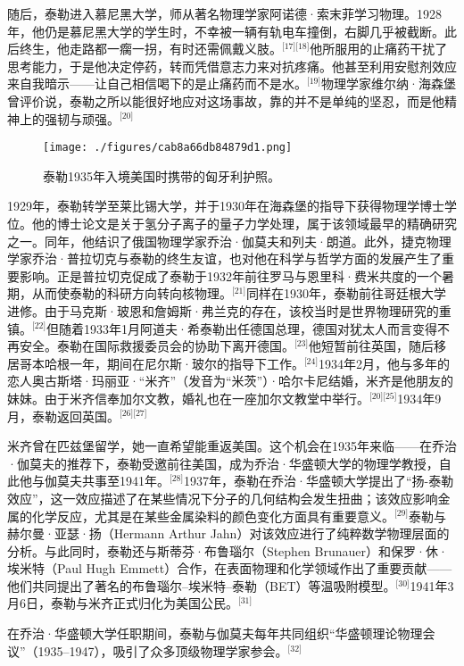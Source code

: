 随后，泰勒进入慕尼黑大学，师从著名物理学家阿诺德·索末菲学习物理。1928年，他仍是慕尼黑大学的学生时，不幸被一辆有轨电车撞倒，右脚几乎被截断。此后终生，他走路都一瘸一拐，有时还需佩戴义肢。\(^\text{[17][18]}\)他所服用的止痛药干扰了思考能力，于是他决定停药，转而凭借意志力来对抗疼痛。他甚至利用安慰剂效应来自我暗示——让自己相信喝下的是止痛药而不是水。\(^\text{[19]}\)物理学家维尔纳·海森堡曾评价说，泰勒之所以能很好地应对这场事故，靠的并不是单纯的坚忍，而是他精神上的强韧与顽强。\(^\text{[20]}\)
\begin{figure}[ht]
\centering
\texttt{[image: ./figures/cab8a66db84879d1.png]}
\caption{泰勒1935年入境美国时携带的匈牙利护照。} \label{fig_ADHTL_3}
\end{figure}
1929年，泰勒转学至莱比锡大学，并于1930年在海森堡的指导下获得物理学博士学位。他的博士论文是关于氢分子离子的量子力学处理，属于该领域最早的精确研究之一。同年，他结识了俄国物理学家乔治·伽莫夫和列夫·朗道。此外，捷克物理学家乔治·普拉切克与泰勒的终生友谊，也对他在科学与哲学方面的发展产生了重要影响。正是普拉切克促成了泰勒于1932年前往罗马与恩里科·费米共度的一个暑期，从而使泰勒的科研方向转向核物理。\(^\text{[21]}\)同样在1930年，泰勒前往哥廷根大学进修。由于马克斯·玻恩和詹姆斯·弗兰克的存在，该校当时是世界物理研究的重镇。\(^\text{[22]}\)但随着1933年1月阿道夫·希泰勒出任德国总理，德国对犹太人而言变得不再安全。泰勒在国际救援委员会的协助下离开德国。\(^\text{[23]}\)他短暂前往英国，随后移居哥本哈根一年，期间在尼尔斯·玻尔的指导下工作。\(^\text{[24]}\)1934年2月，他与多年的恋人奥古斯塔·玛丽亚·“米齐”（发音为“米茨”）·哈尔卡尼结婚，米齐是他朋友的妹妹。由于米齐信奉加尔文教，婚礼也在一座加尔文教堂中举行。\(^\text{[20][25]}\)1934年9月，泰勒返回英国。\(^\text{[26][27]}\)

米齐曾在匹兹堡留学，她一直希望能重返美国。这个机会在1935年来临——在乔治·伽莫夫的推荐下，泰勒受邀前往美国，成为乔治·华盛顿大学的物理学教授，自此他与伽莫夫共事至1941年。\(^\text{[28]}\)1937年，泰勒在乔治·华盛顿大学提出了“扬-泰勒效应”，这一效应描述了在某些情况下分子的几何结构会发生扭曲；该效应影响金属的化学反应，尤其是在某些金属染料的颜色变化方面具有重要意义。\(^\text{[29]}\)泰勒与赫尔曼·亚瑟·扬（Hermann Arthur Jahn）对该效应进行了纯粹数学物理层面的分析。与此同时，泰勒还与斯蒂芬·布鲁瑙尔（Stephen Brunauer）和保罗·休·埃米特（Paul Hugh Emmett）合作，在表面物理和化学领域作出了重要贡献——他们共同提出了著名的布鲁瑙尔–埃米特–泰勒（BET）等温吸附模型。\(^\text{[30]}\)1941年3月6日，泰勒与米齐正式归化为美国公民。\(^\text{[31]}\)

在乔治·华盛顿大学任职期间，泰勒与伽莫夫每年共同组织“华盛顿理论物理会议”（1935–1947），吸引了众多顶级物理学家参会。\(^\text{[32]}\)

